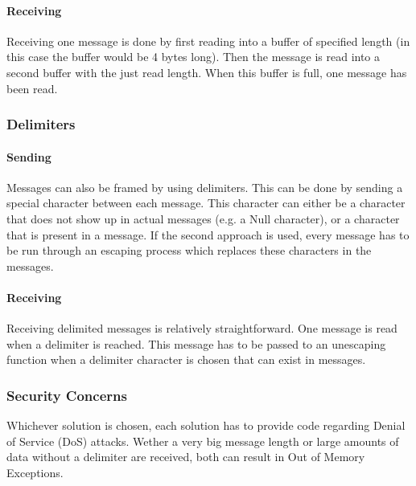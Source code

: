 \paragraph{Receiving}

Receiving one message is done by first reading into a buffer of specified length (in this case the buffer would be 4 bytes long). Then the message is read into a second buffer with the just read length. When this buffer is full, one message has been read.

\subsubsection{Delimiters}

\paragraph{Sending}

Messages can also be framed by using delimiters. This can be done by sending a special character between each message. This character can either be a character that does not show up in actual messages (e.g. a Null character), or a character that is present in a message. If the second approach is used, every message has to be run through an escaping process which replaces these characters in the messages.

\paragraph{Receiving}

Receiving delimited messages is relatively straightforward. One message is read when a delimiter is reached. This message has to be passed to an unescaping function when a delimiter character is chosen that can exist in messages.

\subsubsection{Security Concerns}

Whichever solution is chosen, each solution has to provide code regarding Denial of Service (DoS) attacks. Wether a very big message length or large amounts of data without a delimiter are received, both can result in Out of Memory Exceptions.
